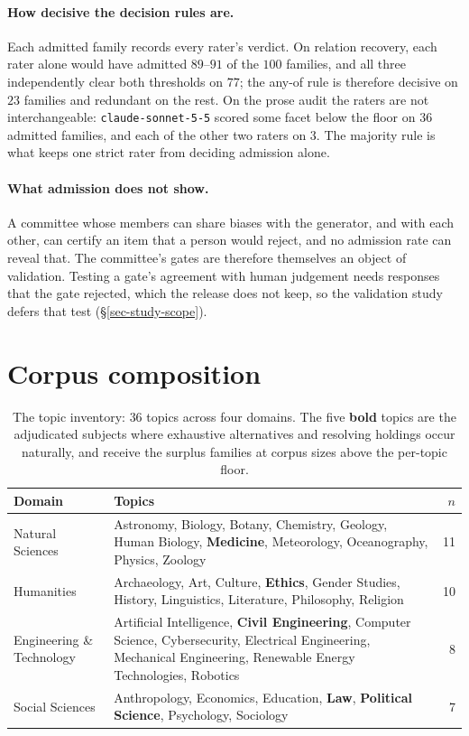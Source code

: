 \paragraph{How decisive the decision rules are.} Each admitted family records every rater's verdict. On relation
recovery, each rater alone would have admitted $89$--$91$ of the $100$ families, and all three independently clear
both thresholds on $77$; the any-of rule is therefore decisive on $23$ families and redundant on the rest. On the
prose audit the raters are not interchangeable: \texttt{claude-sonnet-5-5} scored some facet below the floor on
$36$ admitted families, and each of the other two raters on $3$. The majority rule is what keeps one strict rater
from deciding admission alone.

\paragraph{What admission does not show.} A committee whose members can share biases with the generator, and with
each other, can certify an item that a person would reject, and no admission rate can reveal that. The committee's
gates are therefore themselves an object of validation. Testing a gate's agreement with human judgement needs
responses that the gate rejected, which the release does not keep, so the validation study defers that test
(\S\ref{sec-study-scope}).

\section{Corpus composition}
\label{sec-corpus}

\begin{table}[t]
\centering\small
\caption{The topic inventory: $36$ topics across four domains. The five \textbf{bold} topics are the
  adjudicated subjects where exhaustive alternatives and resolving holdings occur naturally, and receive the
  surplus families at corpus sizes above the per-topic floor.}
\label{tab:topics}
\begin{tabular}{@{}lp{9.3cm}r@{}}
\toprule
Domain & Topics & $n$ \\
\midrule
Natural Sciences & Astronomy, Biology, Botany, Chemistry, Geology, Human Biology,
  \textbf{Medicine}, Meteorology, Oceanography, Physics, Zoology & 11 \\
Humanities & Archaeology, Art, Culture, \textbf{Ethics}, Gender Studies, History, Linguistics,
  Literature, Philosophy, Religion & 10 \\
Engineering \& Technology & Artificial Intelligence, \textbf{Civil Engineering}, Computer Science,
  Cybersecurity, Electrical Engineering, Mechanical Engineering, Renewable Energy Technologies,
  Robotics & 8 \\
Social Sciences & Anthropology, Economics, Education, \textbf{Law},
  \textbf{Political Science}, Psychology, Sociology & 7 \\
\bottomrule
\end{tabular}
\end{table}

